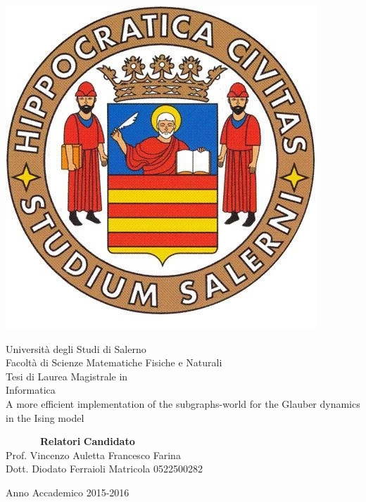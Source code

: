 \documentclass[11pt,oneside]{book}
\theoremstyle{plain}
\begin{document}

\begin{titlepage}
\begin{center}
\begin{center}
\includegraphics[scale=0.28, natwidth=793, natheight=1123]{img/logounisa.jpg}
\end{center}
{\Large Universit\`a degli Studi di Salerno}\\[0.2truecm]
{\large Facolt\`a di Scienze Matematiche Fisiche e Naturali}\\
\hrulefill
\vfill
{\large Tesi di Laurea Magistrale in}\\[0.2truecm]
{\Large Informatica}\\
\vfill\vfill
{\Huge A more efficient implementation of the subgraphs-world for the Glauber dynamics in the Ising model}
\vfill\vfill


\ \ \ \ \ \ \ {\bf Relatori} \hfill {\bf Candidato}\ \ \\
Prof. Vincenzo Auletta \hfill Francesco Farina\\
Dott. Diodato Ferraioli \hfill Matricola 0522500282

\vfill
\hrulefill 

Anno Accademico 2015-2016

\end{center}
\end{titlepage}

\end{document}
